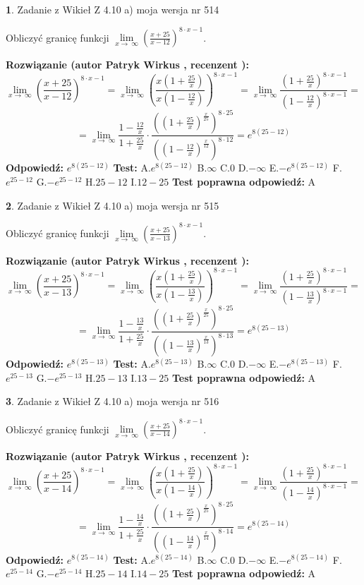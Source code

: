 \documentclass[12pt, a4paper]{article}
\theoremstyle{definition} %
\newtheorem{zad}{}
\newcommand{\zadStart}[1]{\begin{zad}#1\newline}
\newcommand{\zadStop}{\end{zad}}
\newcommand{\rozwStart}[2]{\noindent \textbf{Rozwiązanie (autor #1 , recenzent #2): }\newline}
\newcommand{\rozwStop}{\newline}
\newcommand{\odpStart}{\noindent \textbf{Odpowiedź:}\newline}
\newcommand{\odpStop}{\newline}
\newcommand{\testStart}{\noindent \textbf{Test:}\newline}
\newcommand{\testStop}{\newline}
\newcommand{\kluczStart}{\noindent \textbf{Test poprawna odpowiedź:}\newline}
\newcommand{\kluczStop}{\newline}
\begin{document}
\zadStart{Zadanie z Wikieł Z 4.10 a) moja wersja nr 514}


Obliczyć granicę funkcji  $\lim\limits_{x\to\ \infty}(\frac{x+25}{x-12})^{8\cdot x-1}$.
\zadStop
\rozwStart{Patryk Wirkus}{}
$$\lim\limits_{x\to\ \infty}(\frac{x+25}{x-12})^{8\cdot x-1} = \lim\limits_{x\to\ \infty}(\frac{x(1+\frac{25}{x})}{x(1-\frac{12}{x})})^{8\cdot x-1}=\lim\limits_{x\to\ \infty}\frac{(1+\frac{25}{x})^{8\cdot x-1}}{(1-\frac{12}{x})^{8\cdot x-1}}=$$
$$=\lim\limits_{x\to\ \infty}\frac{1-\frac{12}{x}}{1+\frac{25}{x}}\cdot\frac{((1+\frac{25}{x})^{\frac{x}{25}})^{8\cdot25}}{((1-\frac{12}{x})^{\frac{x}{12}})^{8\cdot12}}=e^{8(25-12)}$$
\rozwStop
\odpStart
$e^{8(25-12)}$
\odpStop
\testStart
A.$e^{8(25-12)}$ B.$\infty$ C.$0$ D.$-\infty$ E.$-e^{8(25-12)}$
F.$e^{25-12}$ G.$-e^{25-12}$
H.$25-12$
I.$12-25$
\testStop
\kluczStart
A
\kluczStop



\zadStart{Zadanie z Wikieł Z 4.10 a) moja wersja nr 515}


Obliczyć granicę funkcji  $\lim\limits_{x\to\ \infty}(\frac{x+25}{x-13})^{8\cdot x-1}$.
\zadStop
\rozwStart{Patryk Wirkus}{}
$$\lim\limits_{x\to\ \infty}(\frac{x+25}{x-13})^{8\cdot x-1} = \lim\limits_{x\to\ \infty}(\frac{x(1+\frac{25}{x})}{x(1-\frac{13}{x})})^{8\cdot x-1}=\lim\limits_{x\to\ \infty}\frac{(1+\frac{25}{x})^{8\cdot x-1}}{(1-\frac{13}{x})^{8\cdot x-1}}=$$
$$=\lim\limits_{x\to\ \infty}\frac{1-\frac{13}{x}}{1+\frac{25}{x}}\cdot\frac{((1+\frac{25}{x})^{\frac{x}{25}})^{8\cdot25}}{((1-\frac{13}{x})^{\frac{x}{13}})^{8\cdot13}}=e^{8(25-13)}$$
\rozwStop
\odpStart
$e^{8(25-13)}$
\odpStop
\testStart
A.$e^{8(25-13)}$ B.$\infty$ C.$0$ D.$-\infty$ E.$-e^{8(25-13)}$
F.$e^{25-13}$ G.$-e^{25-13}$
H.$25-13$
I.$13-25$
\testStop
\kluczStart
A
\kluczStop



\zadStart{Zadanie z Wikieł Z 4.10 a) moja wersja nr 516}


Obliczyć granicę funkcji  $\lim\limits_{x\to\ \infty}(\frac{x+25}{x-14})^{8\cdot x-1}$.
\zadStop
\rozwStart{Patryk Wirkus}{}
$$\lim\limits_{x\to\ \infty}(\frac{x+25}{x-14})^{8\cdot x-1} = \lim\limits_{x\to\ \infty}(\frac{x(1+\frac{25}{x})}{x(1-\frac{14}{x})})^{8\cdot x-1}=\lim\limits_{x\to\ \infty}\frac{(1+\frac{25}{x})^{8\cdot x-1}}{(1-\frac{14}{x})^{8\cdot x-1}}=$$
$$=\lim\limits_{x\to\ \infty}\frac{1-\frac{14}{x}}{1+\frac{25}{x}}\cdot\frac{((1+\frac{25}{x})^{\frac{x}{25}})^{8\cdot25}}{((1-\frac{14}{x})^{\frac{x}{14}})^{8\cdot14}}=e^{8(25-14)}$$
\rozwStop
\odpStart
$e^{8(25-14)}$
\odpStop
\testStart
A.$e^{8(25-14)}$ B.$\infty$ C.$0$ D.$-\infty$ E.$-e^{8(25-14)}$
F.$e^{25-14}$ G.$-e^{25-14}$
H.$25-14$
I.$14-25$
\testStop
\kluczStart
A
\kluczStop
\end{document}
